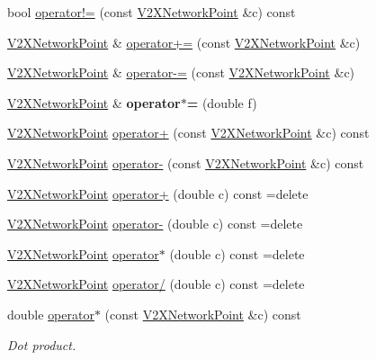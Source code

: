 \begin{DoxyCompactItemize}
\item 
bool \hyperlink{classV2XNetworkPoint_ae6893b5a07b35a46b1af83571155cb4e}{operator!=} (const \hyperlink{classV2XNetworkPoint}{V2\+X\+Network\+Point} \&c) const 
\item 
\hyperlink{classV2XNetworkPoint}{V2\+X\+Network\+Point} \& \hyperlink{classV2XNetworkPoint_a85e1137e6ddd4e864e10c736fc54d10c}{operator+=} (const \hyperlink{classV2XNetworkPoint}{V2\+X\+Network\+Point} \&c)
\item 
\hyperlink{classV2XNetworkPoint}{V2\+X\+Network\+Point} \& \hyperlink{classV2XNetworkPoint_a216ad1c2f697d07f30fb7882f32d93e3}{operator-\/=} (const \hyperlink{classV2XNetworkPoint}{V2\+X\+Network\+Point} \&c)
\item 
\hyperlink{classV2XNetworkPoint}{V2\+X\+Network\+Point} \& {\bfseries operator$\ast$=} (double f)\hypertarget{classV2XNetworkPoint_af177d43dc6552fbfad33a1c6cad8da83}{}\label{classV2XNetworkPoint_af177d43dc6552fbfad33a1c6cad8da83}

\item 
\hyperlink{classV2XNetworkPoint}{V2\+X\+Network\+Point} \hyperlink{classV2XNetworkPoint_a009fdbcc89cf413d854b7adc606ed1ba}{operator+} (const \hyperlink{classV2XNetworkPoint}{V2\+X\+Network\+Point} \&c) const 
\item 
\hyperlink{classV2XNetworkPoint}{V2\+X\+Network\+Point} \hyperlink{classV2XNetworkPoint_a01c8eb3f87d041e2fd8a8b051594de48}{operator-\/} (const \hyperlink{classV2XNetworkPoint}{V2\+X\+Network\+Point} \&c) const 
\item 
\hyperlink{classV2XNetworkPoint}{V2\+X\+Network\+Point} \hyperlink{classV2XNetworkPoint_afe9cc8c40d293a807ec5c77268feec49}{operator+} (double c) const =delete
\item 
\hyperlink{classV2XNetworkPoint}{V2\+X\+Network\+Point} \hyperlink{classV2XNetworkPoint_a564fcf3f5c00448bd7e8c71541b6549e}{operator-\/} (double c) const =delete
\item 
\hyperlink{classV2XNetworkPoint}{V2\+X\+Network\+Point} \hyperlink{classV2XNetworkPoint_aeac4c7b5a5d7ca4677a3bbf0893aa66b}{operator$\ast$} (double c) const =delete
\item 
\hyperlink{classV2XNetworkPoint}{V2\+X\+Network\+Point} \hyperlink{classV2XNetworkPoint_a64325d43c9d8841cecc2568f65bfbd85}{operator/} (double c) const =delete
\item 
double \hyperlink{classV2XNetworkPoint_a40e5af562afded3ba5541b6c57677cc1}{operator$\ast$} (const \hyperlink{classV2XNetworkPoint}{V2\+X\+Network\+Point} \&c) const \hypertarget{classV2XNetworkPoint_a40e5af562afded3ba5541b6c57677cc1}{}\label{classV2XNetworkPoint_a40e5af562afded3ba5541b6c57677cc1}

\begin{DoxyCompactList}\small\item\em Dot product. \end{DoxyCompactList}\end{DoxyCompactItemize}
